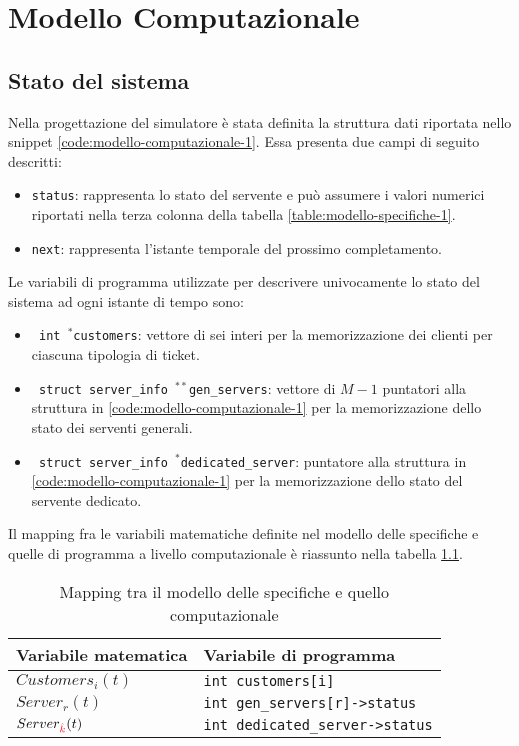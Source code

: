 \chapter{Modello Computazionale}\label{chp:modello-computazionale}
\section{Stato del sistema}\label{sec:modello-computazionale-stato}
Nella progettazione del simulatore è stata definita la struttura dati riportata nello snippet \ref{code:modello-computazionale-1}. Essa presenta due campi di seguito descritti:
\begin{itemize}
\item \texttt{status}: rappresenta lo stato del servente e può assumere i valori numerici riportati nella terza colonna della tabella \ref{table:modello-specifiche-1}.  
\item \texttt{next}: rappresenta l'istante temporale del prossimo completamento.
\end{itemize}



Le variabili di programma utilizzate per descrivere univocamente lo stato del sistema ad ogni istante di tempo sono:
\begin{itemize}
\item \texttt{{\color{code_purple} int} $^*$customers}: vettore di sei interi per la memorizzazione dei clienti per ciascuna tipologia di ticket.
\item \texttt{{\color{code_purple} struct} server\_info $^{**}$gen\_servers}: vettore di $M-1$ puntatori alla struttura in \ref{code:modello-computazionale-1} per la memorizzazione dello stato dei serventi generali.
\item \texttt{{\color{code_purple} struct} server\_info $^*$dedicated\_server}: puntatore alla struttura in \ref{code:modello-computazionale-1} per la memorizzazione dello stato del servente dedicato.
\end{itemize}

Il mapping fra le variabili matematiche definite nel modello delle specifiche e quelle di programma a livello computazionale è riassunto nella tabella \ref{table:modello-computazionale-1}. 

\begin{table}[ht]
\centering
{\tablecolors
\begin{tabular}{| l | l |}
\hline
Variabile matematica & Variabile di programma \\
\hline
$Customers_i(t)$ & \texttt{{\color{code_purple}int} customers[i]} \\
\hline
$Server_r(t)$ & \texttt{{\color{code_purple}int} gen\_servers[r]->status} \\
\hline
$Server_{\color{red}\hat{k}}(t)$ & \texttt{{\color{code_purple}int} dedicated\_server->status} \\
\hline
\end{tabular}}
\caption{Mapping tra il modello delle specifiche e quello computazionale}
\label{table:modello-computazionale-1}
\end{table}

